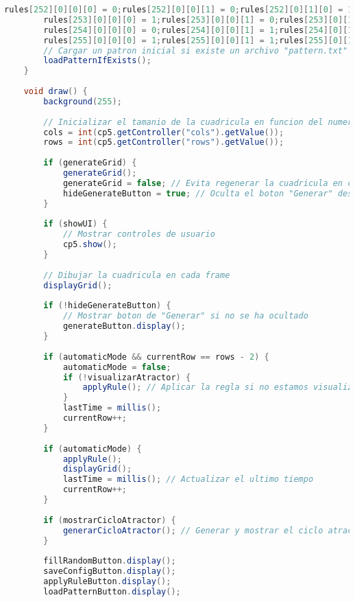 \documentclass{article}
\begin{document}
\begin{lstlisting}[language=Java, basicstyle=\tiny, breaklines=true, breakatwhitespace=true]
		rules[252][0][0][0] = 0;rules[252][0][0][1] = 0;rules[252][0][1][0] = 1;rules[252][0][1][1] = 1;rules[252][1][0][0] = 1;rules[252][1][0][1] = 1;rules[252][1][1][0] = 1;rules[252][1][1][1] = 1;
		rules[253][0][0][0] = 1;rules[253][0][0][1] = 0;rules[253][0][1][0] = 1;rules[253][0][1][1] = 1;rules[253][1][0][0] = 1;rules[253][1][0][1] = 1;rules[253][1][1][0] = 1;rules[253][1][1][1] = 1;
		rules[254][0][0][0] = 0;rules[254][0][0][1] = 1;rules[254][0][1][0] = 1;rules[254][0][1][1] = 1;rules[254][1][0][0] = 1;rules[254][1][0][1] = 1;rules[254][1][1][0] = 1;rules[254][1][1][1] = 1;
		rules[255][0][0][0] = 1;rules[255][0][0][1] = 1;rules[255][0][1][0] = 1;rules[255][0][1][1] = 1;rules[255][1][0][0] = 1;rules[255][1][0][1] = 1;rules[255][1][1][0] = 1;rules[255][1][1][1] = 1;
		// Cargar un patron inicial si existe un archivo "pattern.txt"
		loadPatternIfExists();
	}
	
	void draw() {
		background(255);
		
		// Inicializar el tamanio de la cuadricula en funcion del numero de celdas por lado (filas y columnas)
		cols = int(cp5.getController("cols").getValue());
		rows = int(cp5.getController("rows").getValue());
		
		if (generateGrid) {
			generateGrid();
			generateGrid = false; // Evita regenerar la cuadricula en cada frame
			hideGenerateButton = true; // Oculta el boton "Generar" despues de generar la cuadricula
		}
		
		if (showUI) {
			// Mostrar controles de usuario
			cp5.show();
		}
		
		// Dibujar la cuadricula en cada frame
		displayGrid();
		
		if (!hideGenerateButton) {
			// Mostrar boton de "Generar" si no se ha ocultado
			generateButton.display();
		}
		
		if (automaticMode && currentRow == rows - 2) {
			automaticMode = false;
			if (!visualizarAtractor) {
				applyRule(); // Aplicar la regla si no estamos visualizando el ciclo atractor
			}
			lastTime = millis();
			currentRow++;
		}
		
		if (automaticMode) {
			applyRule();
			displayGrid();
			lastTime = millis(); // Actualizar el ultimo tiempo
			currentRow++;
		}
		
		if (mostrarCicloAtractor) {
			generarCicloAtractor(); // Generar y mostrar el ciclo atractor
		}
		
		fillRandomButton.display();
		saveConfigButton.display();
		applyRuleButton.display();
		loadPatternButton.display();
		

\end{lstlisting}
\end{document}
